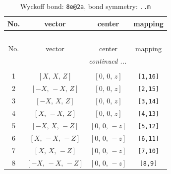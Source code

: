 \documentclass[fleqn,8pt]{jsarticle}
\begin{document}
\begin{longtable}{cccc}
\caption{Wyckoff bond: {\tt 8e@2a}, bond symmetry: {\tt ..m}}
 \\
 \hline \hline
No. & vector & center & mapping \\ \hline \endfirsthead

\multicolumn{3}{l}{\tablename\ \thetable{}} \\
 \hline \hline
No. & vector & center & mapping \\ \hline \endhead

 \hline \hline
\multicolumn{3}{r}{\footnotesize\it continued ...} \\ \endfoot

 \hline \hline
\multicolumn{3}{r}{} \\ \endlastfoot

1 & $\left[ X,\, X,\, Z \right]$ & $\left[ 0,\, 0,\, z \right]$ & {\tt [1,16]} \\ \hline
2 & $\left[ - X,\, - X,\, Z \right]$ & $\left[ 0,\, 0,\, z \right]$ & {\tt [2,15]} \\ \hline
3 & $\left[ - X,\, X,\, Z \right]$ & $\left[ 0,\, 0,\, z \right]$ & {\tt [3,14]} \\ \hline
4 & $\left[ X,\, - X,\, Z \right]$ & $\left[ 0,\, 0,\, z \right]$ & {\tt [4,13]} \\ \hline
5 & $\left[ - X,\, X,\, - Z \right]$ & $\left[ 0,\, 0,\, - z \right]$ & {\tt [5,12]} \\ \hline
6 & $\left[ X,\, - X,\, - Z \right]$ & $\left[ 0,\, 0,\, - z \right]$ & {\tt [6,11]} \\ \hline
7 & $\left[ X,\, X,\, - Z \right]$ & $\left[ 0,\, 0,\, - z \right]$ & {\tt [7,10]} \\ \hline
8 & $\left[ - X,\, - X,\, - Z \right]$ & $\left[ 0,\, 0,\, - z \right]$ & {\tt [8,9]} \\
\end{longtable}
\renewcommand{\arraystretch}{1.2}
\end{document}
